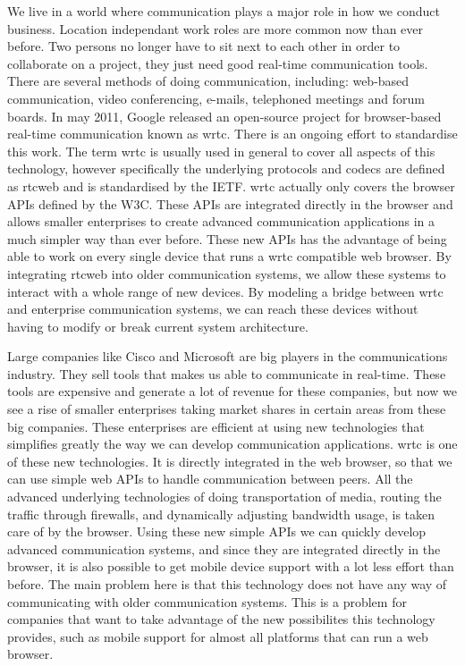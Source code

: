 We live in a world where communication plays a major role in how we conduct business. Location independant work roles are more common now than ever before. Two persons no longer have to sit next to each other in order to collaborate on a project, they just need good real-time communication tools. There are several methods of doing communication, including: web-based communication, video conferencing, e-mails, telephoned meetings and forum boards. In may 2011, Google released an open-source project for browser-based real-time communication known as \gls{wrtc}\cite{google-release-of-webrtc}. There is an ongoing effort to standardise this work. The term \gls{wrtc} is usually used in general to cover all aspects of this technology, however specifically the underlying protocols and codecs are defined as \gls{rtcweb} and is standardised by the IETF\cite{ietf}. \gls{wrtc} actually only covers the browser APIs defined by the W3C\cite{w3c}. These APIs are integrated directly in the browser and allows smaller enterprises to create advanced communication applications in a much simpler way than ever before. These new APIs has the advantage of being able to work on every single device that runs a \gls{wrtc} compatible web browser. By integrating \gls{rtcweb} into older communication systems, we allow these systems to interact with a whole range of new devices. By modeling a bridge between \gls{wrtc} and enterprise communication systems, we can reach these devices without having to modify or break current system architecture.

Large companies like Cisco and Microsoft are big players in the communications industry. They sell tools that makes us able to communicate in real-time. These tools are expensive and generate a lot of revenue for these companies, but now we see a rise of smaller enterprises taking market shares in certain areas from these big companies. These enterprises are efficient at using new technologies that simplifies greatly the way we can develop communication applications. \gls{wrtc} is one of these new technologies. It is directly integrated in the web browser, so that we can use simple web APIs to handle communication between peers. All the advanced underlying technologies of doing transportation of media, routing the traffic through firewalls, and dynamically adjusting bandwidth usage, is taken care of by the browser. Using these new simple APIs we can quickly develop advanced communication systems, and since they are integrated directly in the browser, it is also possible to get mobile device support with a lot less effort than before. The main problem here is that this technology does not have any way of communicating with older communication systems. This is a problem for companies that want to take advantage of the new possibilites this technology provides, such as mobile support for almost all platforms that can run a web browser.


